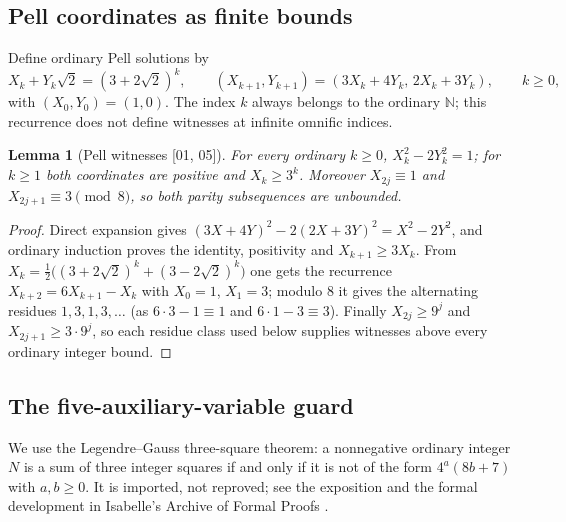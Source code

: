 \documentclass[11pt,oneside]{article}
\numberwithin{equation}{section}
\newtheorem{lemma}[lemma]{Lemma}
\theoremstyle{definition}
\theoremstyle{remark}
\newcommand{\N}{\mathbb N}
\newcommand{\src}[1]{\textup{\textsf{\small[#1]}}}
\begin{document}
\subsection{Pell coordinates as finite bounds}

Define ordinary Pell solutions by
\begin{equation}\label{odg:eq:pellsequence}
 X_k+Y_k\sqrt2=(3+2\sqrt2)^k,\qquad
 (X_{k+1},Y_{k+1})=(3X_k+4Y_k,\,2X_k+3Y_k),\qquad k\geq0,
\end{equation}
with $(X_0,Y_0)=(1,0)$.
The index $k$ always belongs to the ordinary $\N$; this recurrence does not
define witnesses at infinite omnific indices.

\begin{lemma}[Pell witnesses \src{01, 05}]\label{odg:lem:pellsequence}\label{odg:eq:pellmod8}
For every ordinary $k\ge0$, $X_k^2-2Y_k^2=1$; for $k\ge1$ both coordinates
are positive and $X_k\ge3^k$. Moreover $X_{2j}\equiv1$ and
$X_{2j+1}\equiv3\pmod8$, so both parity subsequences are unbounded.
\end{lemma}
\begin{proof}
Direct expansion gives $(3X+4Y)^2-2(2X+3Y)^2=X^2-2Y^2$, and ordinary
induction proves the identity, positivity and $X_{k+1}\ge3X_k$. From
$X_k=\tfrac12\bigl((3+2\sqrt2)^k+(3-2\sqrt2)^k\bigr)$ one gets the recurrence
$X_{k+2}=6X_{k+1}-X_k$ with $X_0=1$, $X_1=3$; modulo $8$ it gives the
alternating residues $1,3,1,3,\ldots$ (as $6\cdot3-1\equiv1$ and
$6\cdot1-3\equiv3$).
Finally $X_{2j}\ge9^j$ and $X_{2j+1}\ge3\cdot9^j$, so each residue class
used below supplies witnesses above every ordinary integer bound.
\end{proof}

\subsection{The five-auxiliary-variable guard}

We use the Legendre--Gauss three-square theorem: a nonnegative ordinary
integer $N$ is a sum of three integer squares if and only if it is not of the
form $4^a(8b+7)$ with $a,b\geq0$. It is imported, not reproved; see the
exposition \cite{Shiu} and the formal development in Isabelle's Archive of
Formal Proofs \cite{ThreeSquares}.
\end{document}
